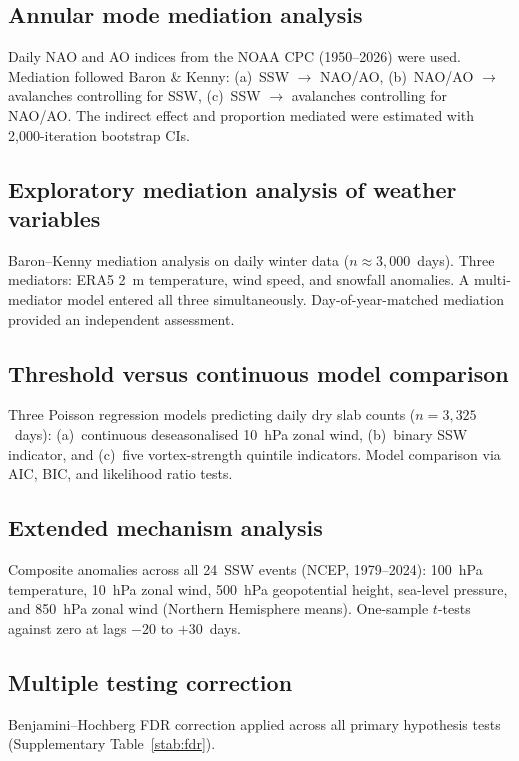 \documentclass[11pt,letterpaper]{article}
\begin{document}
\subsection{Annular mode mediation analysis}

Daily NAO and AO indices from the NOAA CPC (1950--2026) were used. Mediation followed Baron \& Kenny: (a)~SSW $\to$ NAO/AO, (b)~NAO/AO $\to$ avalanches controlling for SSW, (c)~SSW $\to$ avalanches controlling for NAO/AO. The indirect effect and proportion mediated were estimated with 2,000-iteration bootstrap CIs.

\subsection{Exploratory mediation analysis of weather variables}

Baron--Kenny mediation analysis on daily winter data ($n \approx 3{,}000$~days). Three mediators: ERA5 2~m temperature, wind speed, and snowfall anomalies. A multi-mediator model entered all three simultaneously. Day-of-year-matched mediation provided an independent assessment.

\subsection{Threshold versus continuous model comparison}

Three Poisson regression models predicting daily dry slab counts ($n = 3{,}325$~days): (a)~continuous deseasonalised 10~hPa zonal wind, (b)~binary SSW indicator, and (c)~five vortex-strength quintile indicators. Model comparison via AIC, BIC, and likelihood ratio tests.

\subsection{Extended mechanism analysis}

Composite anomalies across all 24~SSW events (NCEP, 1979--2024): 100~hPa temperature, 10~hPa zonal wind, 500~hPa geopotential height, sea-level pressure, and 850~hPa zonal wind (Northern Hemisphere means). One-sample $t$-tests against zero at lags $-20$ to $+30$~days.

\subsection{Multiple testing correction}

Benjamini--Hochberg FDR correction applied across all primary hypothesis tests (Supplementary Table~\ref{stab:fdr}).
\end{document}
